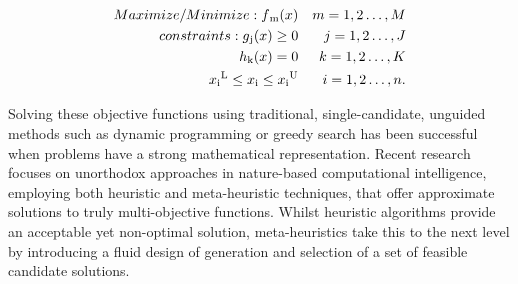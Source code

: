\documentclass[conference]{IEEEtran}
\begin{document}
{\scriptsize
    \begin{align}
    \label{e1}
    Maximize/Minimize:f\textsubscript{m}(x)& &  m = 1,2\dots,M \\
    constraints:g\textsubscript{j}(x) \ge 0& & j=1,2\dots,J \nonumber\\
    h\textsubscript{k}(x) = 0& & k=1,2\dots,K \nonumber\\
    x\textsubscript{i}\textsuperscript{L} \le x\textsubscript{i} \le x\textsubscript{i}\textsuperscript{U} && i = 1,2\dots,n.\nonumber 
    \end{align}
}%

Solving these objective functions using traditional, single-candidate, unguided methods such as dynamic programming or greedy search has been successful when problems have a strong mathematical representation. Recent research focuses on unorthodox approaches in nature-based computational intelligence, employing both heuristic and meta-heuristic techniques, that offer approximate solutions to truly multi-objective functions. Whilst heuristic algorithms provide an acceptable yet non-optimal solution, meta-heuristics take this to the next level by introducing a fluid design of generation and selection of a set of feasible candidate solutions.  

% 
\end{document}
